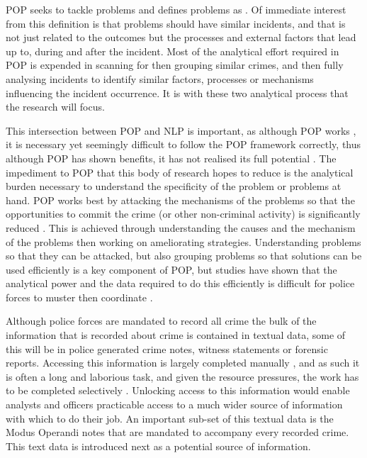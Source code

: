 POP seeks to tackle problems and defines problems as  \parencite{popchap11}. Of immediate interest from this definition is that problems should have similar incidents, and that is not just related to the outcomes but the processes and external factors that lead up to, during and after the incident. Most of the analytical effort required in POP is expended in scanning for then grouping similar crimes, and then fully analysing incidents to identify similar factors, processes or mechanisms influencing the incident occurrence. It is with these two analytical process that the research will focus.

This intersection between POP and NLP is important, as although POP works \parencite{hinkle2020problem}, it is necessary yet seemingly difficult to follow the POP framework correctly, thus although POP has shown benefits, it has not realised its full potential \parencite{POPUCL}. The impediment to POP that this body of research hopes to reduce is the analytical burden necessary to understand the specificity of the problem or problems at hand. POP works best by attacking the mechanisms of the problems so that the opportunities to commit the crime (or other non-criminal activity) is significantly reduced \parencite{clarke2003becoming}. This is achieved through understanding the causes and the mechanism of the problems then working on ameliorating strategies. Understanding problems so that they can be attacked, but also grouping problems so that solutions can be used efficiently is a key component of POP, but studies have shown that the analytical power and the data required to do this efficiently is difficult for police forces to muster then coordinate \parencite{sidebottom2020implementing}. 

Although police forces are mandated to record all crime \parencite{home2020crime} the bulk of the information that is recorded about crime is contained in textual data, some of this will be in police generated crime notes, witness statements or forensic reports. Accessing this information is largely completed manually \parencite{goldstein1990}, and as such it is often a long and laborious task, and given the resource pressures, the work has to be completed selectively \parencite{rogerson2016utility}. Unlocking access to this information would enable analysts and officers practicable access to a much wider source of information with which to do their job. An important sub-set of this textual data is the Modus Operandi notes that are mandated to accompany every recorded crime. This text data is introduced next as a potential source of information.   
 
